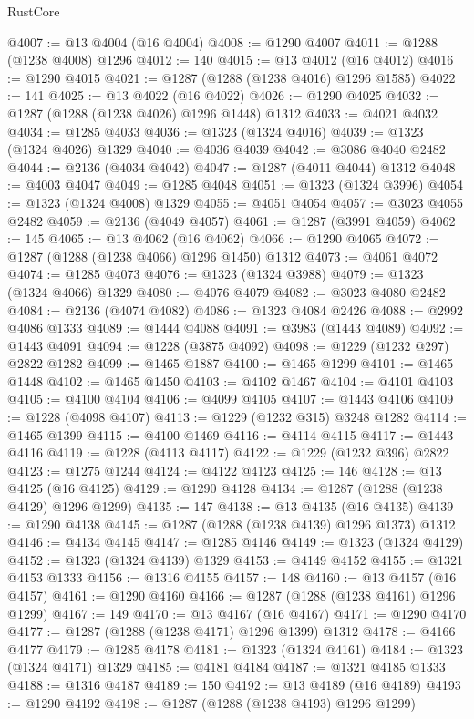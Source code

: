 \begin{lexlean}{RustCore}
\begin{coremodule}
@4007 := @13 @4004 (@16 @4004)
@4008 := @1290 @4007
@4011 := @1288 (@1238 @4008) @1296
@4012 := 140
@4015 := @13 @4012 (@16 @4012)
@4016 := @1290 @4015
@4021 := @1287 (@1288 (@1238 @4016) @1296 @1585)
@4022 := 141
@4025 := @13 @4022 (@16 @4022)
@4026 := @1290 @4025
@4032 := @1287 (@1288 (@1238 @4026) @1296 @1448) @1312
@4033 := @4021 @4032
@4034 := @1285 @4033
@4036 := @1323 (@1324 @4016)
@4039 := @1323 (@1324 @4026) @1329
@4040 := @4036 @4039
@4042 := @3086 @4040 @2482
@4044 := @2136 (@4034 @4042)
@4047 := @1287 (@4011 @4044) @1312
@4048 := @4003 @4047
@4049 := @1285 @4048
@4051 := @1323 (@1324 @3996)
@4054 := @1323 (@1324 @4008) @1329
@4055 := @4051 @4054
@4057 := @3023 @4055 @2482
@4059 := @2136 (@4049 @4057)
@4061 := @1287 (@3991 @4059)
@4062 := 145
@4065 := @13 @4062 (@16 @4062)
@4066 := @1290 @4065
@4072 := @1287 (@1288 (@1238 @4066) @1296 @1450) @1312
@4073 := @4061 @4072
@4074 := @1285 @4073
@4076 := @1323 (@1324 @3988)
@4079 := @1323 (@1324 @4066) @1329
@4080 := @4076 @4079
@4082 := @3023 @4080 @2482
@4084 := @2136 (@4074 @4082)
@4086 := @1323 @4084 @2426
@4088 := @2992 @4086 @1333
@4089 := @1444 @4088
@4091 := @3983 (@1443 @4089)
@4092 := @1443 @4091
@4094 := @1228 (@3875 @4092)
@4098 := @1229 (@1232 @297) @2822 @1282
@4099 := @1465 @1887
@4100 := @1465 @1299
@4101 := @1465 @1448
@4102 := @1465 @1450
@4103 := @4102 @1467
@4104 := @4101 @4103
@4105 := @4100 @4104
@4106 := @4099 @4105
@4107 := @1443 @4106
@4109 := @1228 (@4098 @4107)
@4113 := @1229 (@1232 @315) @3248 @1282
@4114 := @1465 @1399
@4115 := @4100 @1469
@4116 := @4114 @4115
@4117 := @1443 @4116
@4119 := @1228 (@4113 @4117)
@4122 := @1229 (@1232 @396) @2822
@4123 := @1275 @1244
@4124 := @4122 @4123
@4125 := 146
@4128 := @13 @4125 (@16 @4125)
@4129 := @1290 @4128
@4134 := @1287 (@1288 (@1238 @4129) @1296 @1299)
@4135 := 147
@4138 := @13 @4135 (@16 @4135)
@4139 := @1290 @4138
@4145 := @1287 (@1288 (@1238 @4139) @1296 @1373) @1312
@4146 := @4134 @4145
@4147 := @1285 @4146
@4149 := @1323 (@1324 @4129)
@4152 := @1323 (@1324 @4139) @1329
@4153 := @4149 @4152
@4155 := @1321 @4153 @1333
@4156 := @1316 @4155
@4157 := 148
@4160 := @13 @4157 (@16 @4157)
@4161 := @1290 @4160
@4166 := @1287 (@1288 (@1238 @4161) @1296 @1299)
@4167 := 149
@4170 := @13 @4167 (@16 @4167)
@4171 := @1290 @4170
@4177 := @1287 (@1288 (@1238 @4171) @1296 @1399) @1312
@4178 := @4166 @4177
@4179 := @1285 @4178
@4181 := @1323 (@1324 @4161)
@4184 := @1323 (@1324 @4171) @1329
@4185 := @4181 @4184
@4187 := @1321 @4185 @1333
@4188 := @1316 @4187
@4189 := 150
@4192 := @13 @4189 (@16 @4189)
@4193 := @1290 @4192
@4198 := @1287 (@1288 (@1238 @4193) @1296 @1299)

\end{coremodule}
\end{lexlean}
